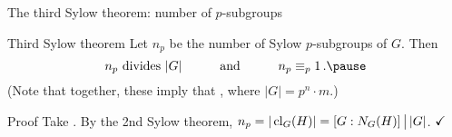 \documentclass[8pt, handout]{beamer}
\newcommand{\Pause}{\pause}      %
\begin{document}
\begin{frame}{The third Sylow theorem: number of $p$-subgroups}

  \begin{block}{Third Sylow theorem}
    Let $n_p$ be the number of Sylow $p$-subgroups of $G$.  Then
    \[
    \mbox{$n_p$ divides $|G|$}\qquad\quad\mbox{and}\qquad\quad
    n_p\equiv_p 1\,. \vspace{-2mm}\Pause
    \]
    (Note that together, these imply that , where
    $|G|=p^n\cdot m$.)
  \end{block}

  \Pause

  \begin{exampleblock}{Proof} %
    Take . By the 2nd Sylow theorem,
    $n_p=|\operatorname{cl}_G(H)|=[G:N_G(H)]\,\big|\,|G|$. $\hfill\checkmark$ \medskip\Pause
    

\end{exampleblock}
\end{frame}
\end{document}
